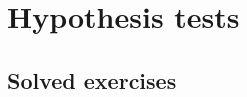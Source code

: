 
\chapter{Hypothesis tests}\label{cha:hypothesis-tests}

\section{Solved exercises}
\begin{enumerate}[leftmargin=*]
% 

\end{enumerate}
